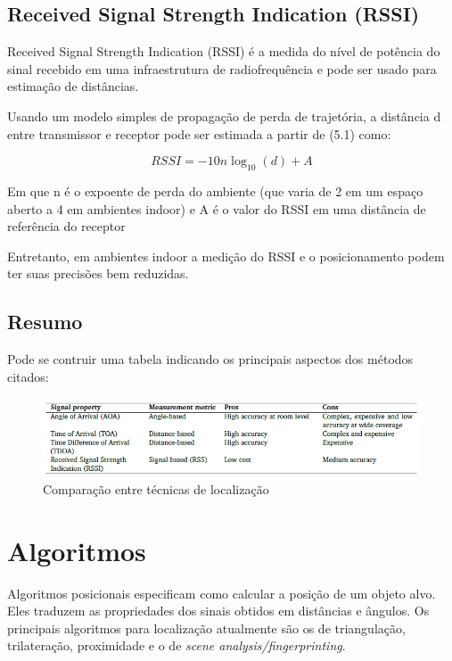 \subsection{Received Signal Strength Indication (RSSI)}
Received Signal Strength Indication (RSSI) é a medida do nível de potência do sinal recebido em uma infraestrutura de radiofrequência e pode ser usado para estimação de distâncias.

Usando um modelo simples de propagação de perda de trajetória, a distância d entre transmissor e receptor pode ser estimada a partir de (5.1) como:

\begin{equation} \label{eq:rssi}
RSSI = -10n\log_{10} (d) + A
\end{equation}

Em que n é o expoente de perda do ambiente (que varia de 2 em um espaço aberto a 4 em ambientes indoor) e A é o valor do RSSI em uma distância de referência do receptor

Entretanto, em ambientes indoor a medição do RSSI e o posicionamento podem ter suas precisões bem reduzidas. \cite{art1}

\subsection{Resumo}
Pode se contruir uma tabela indicando os principais aspectos dos métodos citados:

\begin{figure}[H]
	\centering
	\includegraphics[scale = 1]{images/signal_table.png}
	\caption{Comparação entre técnicas de localização \cite{art1}}
	\label{fig:signal_table.png}
\end{figure}

\section{Algoritmos}

Algoritmos posicionais especificam como calcular a posição de um objeto alvo. Eles traduzem as propriedades dos sinais obtidos em distâncias e ângulos. Os principais algoritmos para localização atualmente são os de triangulação, trilateração, proximidade e o de \textit{scene analysis/fingerprinting}.

